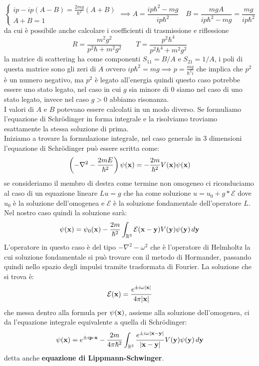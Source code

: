  \[\begin{cases}ip-ip(A-B) = \frac{2mg}{\hbar^2}(A+B) \\ A+B=1\end{cases} \implies A = \frac{ip\hbar^2 -mg}{ip\hbar^2} \quad B = \frac{mgA}{ip\hbar^2-mg} = \frac{mg}{ip\hbar^2} \]
 da cui è possibile anche calcolare i coefficienti di trasmissione e riflessione
 \[R = \frac{m^2g^2}{p^2\hbar+m^2g^2} \qquad T = \frac{p^2\hbar^4}{p^2\hbar^4+m^2g^2}\]
 la matrice di scattering ha come componenti $S_{11}= B/A$ e $S_{21} = 1/A$, i poli di questa matrice sono gli zeri di $A$ ovvero $ip\hbar^2= mg \implies p =\frac{mg}{\hbar^2i}$ che implica che $p^2$ è un numero negativo, ma $p^2$ è legato all'energia quindi questo caso potrebbe essere uno stato legato, nel caso in cui $g$ sia minore di 0 siamo nel caso di uno stato legato, invece nel caso $g>0$ abbiamo risonanza.\\
 I valori di $A$ e $B$ potevano essere calcolati in un modo diverso. Se formuliamo l'equazione di Schr{\"o}dinger in forma integrale e la risolviamo troviamo esattamente la stessa soluzione di prima.\\
 Iniziamo a trovare la formulazione integrale, nel caso generale in 3 dimensioni l'equazione di Schr{\"o}dinger può essere scritta come:
 \[\left(-\nabla^2 -\frac{2mE}{\hbar^2}\right)\psi(\mathbf{x}) = -\frac{2m}{\hbar^2}V(\mathbf{x})\psi(\mathbf{x})\] 
 se consideriamo il membro di destra come termine non omogeneo ci riconduciamo al caso di un equazione lineare $Lu = g$ che ha come soluzione $u = u_0 + g*\mathcal{E}$ dove $u_0$ è la soluzione dell'omogenea e $\mathcal{E}$ è la soluzione fondamentale dell'operatore $L$. Nel nostro caso quindi la soluzione sarà:
 \[\psi(\mathbf{x}) = \psi_0(\mathbf{x}) -\frac{2m}{\hbar^2}\int_{\mathbb{R}^3}\mathcal{E}(\mathbf{x}-\mathbf{y})V(\mathbf{y})\psi(\mathbf{y})\,d\mathbf{y} \]
 L'operatore in questo caso è del tipo $-\nabla^2 - \omega^2$ che è l'operatore di Helmholtz la cui soluzione fondamentale si può trovare con il metodo di Hormander, passando quindi nello spazio degli impulsi tramite trasformata di Fourier. La soluzione che si trova è:
 \[\mathcal{E}(\mathbf{x}) = \frac{e^{\pm i\omega|\mathbf{x}|}}{4\pi|\mathbf{x}|}\]
 che messa dentro alla formula per $\psi(\mathbf{x})$, assieme alla soluzione dell'omogenea, ci da l'equazione integrale equivalente a quella di Schr{\"o}dinger:
 \[\psi(\mathbf{x}) = e^{\pm i \mathbf{p}\cdot \mathbf{x}} -\frac{2m}{4\pi\hbar^2}\int_{\mathbb{R}^3} \frac{e^{\pm i\omega|\mathbf{x}-\mathbf{y}|}}{|\mathbf{x}-\mathbf{y}|}V(\mathbf{y})\psi(\mathbf{y})\,d\mathbf{y} \]
 detta anche \textbf{equazione di Lippmann-Schwinger}.\\
